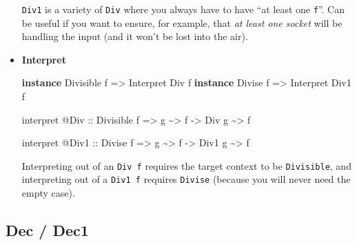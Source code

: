 \documentclass[]{article}
\newenvironment{Shaded}{}{}
\newcommand{\DataTypeTok}[1]{\textcolor[rgb]{0.56,0.13,0.00}{#1}}
\newcommand{\KeywordTok}[1]{\textcolor[rgb]{0.00,0.44,0.13}{\textbf{#1}}}
\newcommand{\NormalTok}[1]{#1}
\newcommand{\OperatorTok}[1]{\textcolor[rgb]{0.40,0.40,0.40}{#1}}
\newcommand{\OtherTok}[1]{\textcolor[rgb]{0.00,0.44,0.13}{#1}}
\begin{document}
\begin{itemize}
  \texttt{Div1} is a variety of \texttt{Div} where you always have to have ``at
  least one \texttt{f}''. Can be useful if you want to ensure, for example, that
  \emph{at least one socket} will be handling the input (and it won't be lost
  into the air).
\item
  \textbf{Interpret}

\begin{Shaded}
\begin{Highlighting}[]
\KeywordTok{instance} \DataTypeTok{Divisible}\NormalTok{ f }\OtherTok{=\textgreater{}} \DataTypeTok{Interpret} \DataTypeTok{Div}\NormalTok{  f}
\KeywordTok{instance} \DataTypeTok{Divise}\NormalTok{    f }\OtherTok{=\textgreater{}} \DataTypeTok{Interpret} \DataTypeTok{Div1}\NormalTok{ f}

\NormalTok{interpret }\OperatorTok{@}\DataTypeTok{Div}
\OtherTok{    ::} \DataTypeTok{Divisible}\NormalTok{ f}
    \OtherTok{=\textgreater{}}\NormalTok{ g }\OperatorTok{\textasciitilde{}\textgreater{}}\NormalTok{ f}
    \OtherTok{{-}\textgreater{}} \DataTypeTok{Div}\NormalTok{ g }\OperatorTok{\textasciitilde{}\textgreater{}}\NormalTok{ f}

\NormalTok{interpret }\OperatorTok{@}\DataTypeTok{Div1}
\OtherTok{    ::} \DataTypeTok{Divise}\NormalTok{ f}
    \OtherTok{=\textgreater{}}\NormalTok{ g }\OperatorTok{\textasciitilde{}\textgreater{}}\NormalTok{ f}
    \OtherTok{{-}\textgreater{}} \DataTypeTok{Div1}\NormalTok{ g }\OperatorTok{\textasciitilde{}\textgreater{}}\NormalTok{ f}
\end{Highlighting}
\end{Shaded}

  Interpreting out of an \texttt{Div\ f} requires the target context to be
  \texttt{Divisible}, and interpreting out of a \texttt{Div1\ f} requires
  \texttt{Divise} (because you will never need the empty case).
\end{itemize}

\subsection{Dec / Dec1}\label{dec-dec1}
\end{document}
